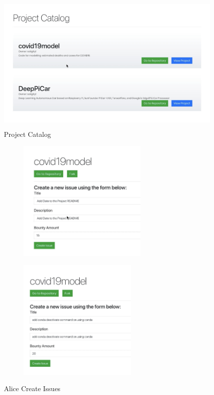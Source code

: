 \documentclass[12pt]{article}
\renewcommand{\_}{\kern-1.5pt\textunderscore\kern-1.5pt}
\begin{document}
\begin{figure}[H]
	\centering
	\includegraphics[height=7cm]{graphs/25. added_project_catalog}
	\caption{Project Catalog}
\end{figure}

\begin{figure}[H]
	\centering
	\begin{subfigure}[b]{.45\textwidth}
		\centering
		\includegraphics[height=6cm]{graphs/26. alice_create_issue1}
	\end{subfigure}
	\begin{subfigure}[b]{.45\textwidth}
		\centering
		\includegraphics[height=6cm]{graphs/27. alice_create_issue2}
	\end{subfigure}
	\caption{Alice Create Issues}
\end{figure}
\end{document}
